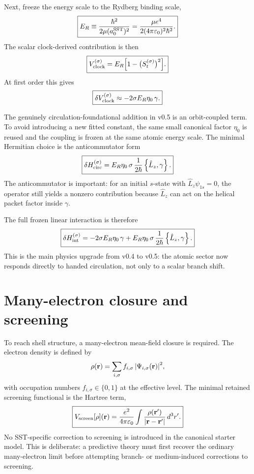 \documentclass[11pt,a4paper]{article}
\begin{document}
Next, freeze the energy scale to the Rydberg binding scale,
\begin{equation}
\label{eq:ERfreeze}
\boxed{
E_R \equiv \frac{\hbar^2}{2\mu (a_0^{\rm SST})^2}
= \frac{\mu e^4}{2(4\pi\varepsilon_0)^2\hbar^2}.
}
\end{equation}
The scalar clock-derived contribution is then
\begin{equation}
\label{eq:Vclock}
\boxed{
V_{\rm clock}^{(\sigma)}
=
E_R\Bigl[1-\bigl(S_t^{(\sigma)}\bigr)^2\Bigr].
}
\end{equation}
At first order this gives
\begin{equation}
\label{eq:Vclock-linear}
\boxed{
\delta V_{\rm clock}^{(\sigma)}
\approx
-2\sigma E_R\eta_0\,\gamma.
}
\end{equation}

The genuinely circulation-foundational addition in v0.5 is an orbit-coupled term. To avoid introducing a new fitted constant, the same small canonical factor $\eta_0$ is reused and the coupling is frozen at the same atomic energy scale. The minimal Hermitian choice is the anticommutator form
\begin{equation}
\label{eq:HintCirc}
\boxed{
\delta H_{\rm circ}^{(\sigma)}
=
E_R\eta_0\,\sigma\,\frac{1}{2\hbar}
\left\{\hat L_z,\gamma\right\}.
}
\end{equation}
The anticommutator is important: for an initial $s$-state with $\hat L_z\psi_{1s}=0$, the operator still yields a nonzero contribution because $\hat L_z$ can act on the helical packet factor inside $\gamma$.

The full frozen linear interaction is therefore
\begin{equation}
\label{eq:HintTotal}
\boxed{
\delta H_{\rm int}^{(\sigma)}
=
-2\sigma E_R\eta_0\,\gamma
+
E_R\eta_0\,\sigma\,\frac{1}{2\hbar}
\left\{\hat L_z,\gamma\right\}.
}
\end{equation}
This is the main physics upgrade from v0.4 to v0.5: the atomic sector now responds directly to handed circulation, not only to a scalar branch shift.

\section{Many-electron closure and screening}
To reach shell structure, a many-electron mean-field closure is required. The electron density is defined by
\begin{equation}
\label{eq:rho-def}
\rho(\mathbf r)=\sum_{i,\sigma} f_{i,\sigma}\,\abs{\Psi_{i,\sigma}(\mathbf r)}^2,
\end{equation}
with occupation numbers $f_{i,\sigma}\in\{0,1\}$ at the effective level. The minimal retained screening functional is the Hartree term,
\begin{equation}
\label{eq:Vscreen}
\boxed{
V_{\rm screen}[\rho](\mathbf r)
=
\frac{e^2}{4\pi\varepsilon_0}
\int \frac{\rho(\mathbf r')}{\abs{\mathbf r-\mathbf r'}}\,d^3r'.
}
\end{equation}
No SST-specific correction to screening is introduced in the canonical starter model. This is deliberate: a predictive theory must first recover the ordinary many-electron limit before attempting branch- or medium-induced corrections to screening.
\end{document}
